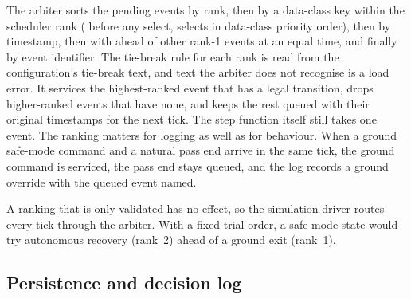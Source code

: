 \documentclass[preprint,12pt]{elsarticle}
\begin{document}
\begin{table}[t]
\centering
\small
\caption{Event conflict-resolution ranks shared by the three configurations.}
\label{tab:conflict}
\end{table}

The arbiter sorts the pending events by rank, then by a data-class key within the scheduler rank ( before any select, selects in data-class priority order), then by timestamp, then with  ahead of other rank-1 events at an equal time, and finally by event identifier. The tie-break rule for each rank is read from the configuration's tie-break text, and text the arbiter does not recognise is a load error. It services the highest-ranked event that has a legal transition, drops higher-ranked events that have none, and keeps the rest queued with their original timestamps for the next tick. The step function itself still takes one event. The ranking matters for logging as well as for behaviour. When a ground safe-mode command and a natural pass end arrive in the same tick, the ground command is serviced, the pass end stays queued, and the log records a ground override with the queued event named.

A ranking that is only validated has no effect, so the simulation driver routes every tick through the arbiter. With a fixed trial order, a safe-mode state would try autonomous recovery (rank~2) ahead of a ground exit (rank~1).

\subsection{Persistence and decision log}\label{sec:persistence}
\end{document}
